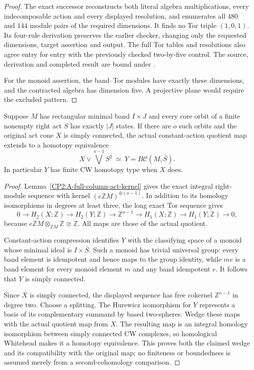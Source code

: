 \begin{proof}
The exact successor
reconstructs both literal algebra multiplications, every
indecomposable action and every displayed resolution, and
enumerates all $480$ and $144$ module pairs of the required
dimensions. It finds no Tor triple $(1,0,1)$. Its four-rule
derivation preserves the earlier checker, changing only the
requested dimensions, target assertion and output. The full
Tor tables and resolutions also agree entry for entry with
the previously checked two-by-five control. The source,
derivation and completed result are bound under
.

For the monoid assertion, the band--Tor modules have exactly
these dimensions, and the contracted algebra has dimension
five. A projective plane would require the excluded pattern.
\end{proof}

\begin{lemma}
\label{CP2:A-full-column-orbit-wedge}
Suppose $M$ has rectangular minimal band $I\times J$ and
every core orbit of a finite nonempty right act $S$ has
exactly $|J|$ states. If there are $o$ such orbits and the
original act cone $X$ is simply connected, the actual
constant-action quotient map extends to a homotopy equivalence
\[
 X\vee\bigvee^{o-1}S^2\ \simeq\
 Y=B\mathcal C(M,\bar S).
\]
In particular $Y$ has finite CW homotopy type when $X$ does.
\end{lemma}
\begin{proof}
Lemma~\ref{CP2:A-full-column-act-kernel} gives the exact
integral right-module sequence with kernel
$(e\mathbb ZM)^{\oplus(o-1)}$. In addition to its homology
isomorphisms in degrees at least three, the long exact Tor
sequence gives
\[
 0\longrightarrow H_2(X;\mathbb Z)
 \longrightarrow H_2(Y;\mathbb Z)
 \longrightarrow\mathbb Z^{o-1}
 \longrightarrow H_1(X;\mathbb Z)
 \longrightarrow H_1(Y;\mathbb Z)\longrightarrow0,
\]
because $e\mathbb ZM\otimes_{\mathbb ZM}\mathbb Z
\cong\mathbb Z$. All maps are those of the actual quotient.

Constant-action compression identifies $Y$ with the
classifying space of a monoid whose minimal ideal is
$I\times\bar S$. Such a monoid has trivial universal group:
every band element is idempotent and hence maps to the
group identity, while $me$ is a band element for every
monoid element $m$ and any band idempotent $e$. It follows
that $Y$ is simply connected.

Since $X$ is simply connected, the displayed sequence has
free cokernel $\mathbb Z^{o-1}$ in degree two. Choose a
splitting. The Hurewicz isomorphism for $Y$ represents a
basis of its complementary summand by based two-spheres.
Wedge these maps with the actual quotient map from $X$.
The resulting map is an integral homology isomorphism
between simply connected CW complexes, so homological
Whitehead makes it a homotopy equivalence. This proves
both the claimed wedge and its compatibility with the
original map; no finiteness or boundedness is assumed
merely from a second-cohomology comparison.
\end{proof}

